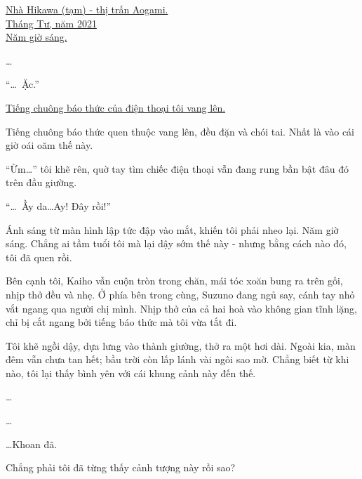 \documentclass[../main.tex]{subfiles}
\begin{document}

\begin{center}
  \uline{Nhà Hikawa (tạm) - thị trấn Aogami.\\Tháng Tư, năm 2021\\Năm giờ sáng.}
\end{center}

\dots

``\dots\ Ặc.''

\href{https://www.youtube.com/watch?v=Mqokmn0WOMo}{Tiếng chuông báo thức của điện thoại tôi vang lên.}

Tiếng chuông báo thức quen thuộc vang lên, đều đặn và chói tai. Nhất là vào cái giờ oái oăm thế này.

``Ừm\dots'' tôi khẽ rên, quờ tay tìm chiếc điện thoại vẫn đang rung bần bật đâu đó trên đầu giường.

``\dots\ Ầy da\dots Ay! Đây rồi!''

Ánh sáng từ màn hình lập tức đập vào mắt, khiến tôi phải nheo lại. Năm giờ sáng. Chẳng ai tầm tuổi tôi mà lại dậy sớm thế này - nhưng bằng cách nào đó, tôi đã quen rồi.

Bên cạnh tôi, Kaiho vẫn cuộn tròn trong chăn, mái tóc xoăn bung ra trên gối, nhịp thở đều và nhẹ. Ở phía bên trong cùng, Suzuno đang ngủ say, cánh tay nhỏ vắt ngang qua người chị mình. Nhịp thở của cả hai hoà vào không gian tĩnh lặng, chỉ bị cắt ngang bởi tiếng báo thức mà tôi vừa tắt đi.

Tôi khẽ ngồi dậy, dựa lưng vào thành giường, thở ra một hơi dài. Ngoài kia, màn đêm vẫn chưa tan hết; bầu trời còn lấp lánh vài ngôi sao mờ. Chẳng biết từ khi nào, tôi lại thấy bình yên với cái khung cảnh này đến thế.

\dots

\dots

\dots Khoan đã.

Chẳng phải tôi đã từng thấy cảnh tượng này rồi sao?
\end{document}
